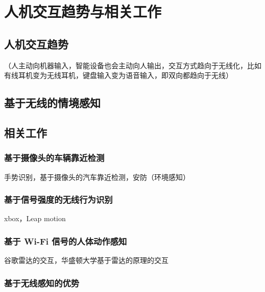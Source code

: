 \chapter{人机交互趋势与相关工作}

\section{人机交互趋势}

（人主动向机器输入，智能设备也会主动向人输出，交互方式趋向于无线化，比如有线耳机变为无线耳机，键盘输入变为语音输入，即双向都趋向于无线）

\section{基于无线的情境感知}

\section{相关工作}


\subsection{基于摄像头的车辆靠近检测}

手势识别，基于摄像头的汽车靠近检测，安防（环境感知）

\subsection{基于信号强度的无线行为识别}
xbox，Leap motion

\subsection{基于 Wi-Fi 信号的人体动作感知}

谷歌雷达的交互，华盛顿大学基于雷达的原理的交互

\subsection{基于无线感知的优势}
























